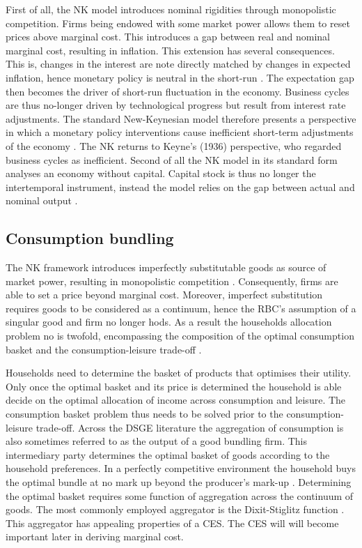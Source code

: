 \documentclass[12pt,a4paper,english]{article} %
\begin{document}
	First of all, the NK model introduces nominal rigidities through monopolistic competition. Firms being endowed with some market power allows them to reset prices above marginal cost. This introduces a gap between real and nominal marginal cost, resulting in inflation. This extension has several consequences. This is, changes in the interest are note directly matched by changes in expected inflation, hence monetary policy is neutral in the short-run \cite{gali_monetary_2008}. The expectation gap then becomes the driver of short-run fluctuation in the economy. Business cycles are thus no-longer driven by technological progress but result from interest rate adjustments. The standard New-Keynesian model therefore presents a perspective in which a monetary policy interventions cause inefficient short-term adjustments of the economy \cite{gali_monetary_2008}. The NK returns to Keyne's (1936) perspective, who regarded business cycles as inefficient. 	
	Second of all the NK model in its standard form analyses an economy without capital. Capital stock is thus no longer the intertemporal instrument, instead the model relies on the gap between actual and nominal output \cite{gali_monetary_2008}.
		
	\subsection{Consumption bundling} \label{nk_bundle}
	The \ac{NK} framework introduces imperfectly substitutable goods as source of market power, resulting in monopolistic competition \cite{gali_monetary_2008}. Consequently, firms are able to set a price beyond marginal cost. Moreover, imperfect substitution requires goods to be considered as a continuum, hence the RBC's assumption of a singular good and firm no longer hods. As a result the households allocation problem no is twofold, encompassing the composition of the optimal consumption basket and the consumption-leisure trade-off \cite{gali_monetary_2008}.
	
	Households need to determine the basket of products that optimises their utility. Only once the optimal basket and its price is determined the household is able decide on the optimal allocation of income across consumption and leisure. The consumption basket problem thus needs to be solved prior to the consumption-leisure trade-off. Across the DSGE literature the aggregation of consumption is also sometimes referred to as the output of a good bundling firm. This intermediary party determines the optimal basket of goods according to the household preferences. In a perfectly competitive environment the household buys the optimal bundle at no mark up beyond the producer's mark-up \cite{gali_monetary_2008}.
	Determining the optimal basket requires some function of aggregation across the continuum of goods. The most commonly employed aggregator is the Dixit-Stiglitz function \cite{dixit_monopolistic_1977}. This aggregator has appealing properties of a \ac{CES}. The CES will will become important later in deriving marginal cost.
	
\end{document}
